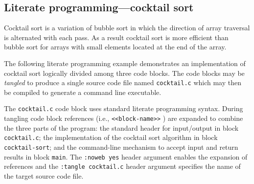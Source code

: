 \documentclass[article,shortnames]{jss}
\begin{document}
\subsection{Literate programming---cocktail sort}
\label{sec-4-2}

Cocktail sort \cite{rosettacode} is a variation of bubble sort in which
the direction of array traversal is alternated with each pass.  As a
result cocktail sort is more efficient than bubble sort for arrays
with small elements located at the end of the array.

The following literate programming example demonstrates an
implementation of cocktail sort logically divided among three code
blocks.  The code blocks may be \emph{tangled} to produce a single source
code file named \texttt{cocktail.c} which may then be compiled to generate a
command line executable.

The \texttt{cocktail.c} code block uses standard literate programming
syntax.  During tangling code block references
(i.e.,
  \verb=<<block-name>>=
) are expanded to combine the three parts of the program: the standard
 header for input/output in block \texttt{cocktail.c}; the implementation of
the cocktail sort algorithm in block \texttt{cocktail-sort}; and the
command-line mechanism to accept input and return results in block
\texttt{main}.  The \texttt{:noweb yes} header argument enables the expansion of
 references and the \texttt{:tangle cocktail.c} header argument
specifies the name of the target source code file.
\end{document}
